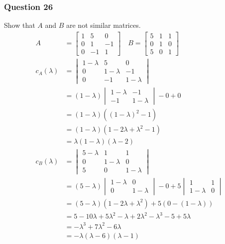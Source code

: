 \documentclass{math}
\begin{document}
\subsubsection*{Question 26}
Show that \( A \) and \( B \) are not similar matrices.
\begin{align*}
  A &= \begin{bmatrix}
    1 & 5 & 0 \\
    0 & 1 & -1 \\
    0 & -1 & 1
  \end{bmatrix} \quad B = \begin{bmatrix}
    5 & 1 & 1 \\
    0 & 1 & 0 \\
    5 & 0 & 1
  \end{bmatrix} \\
  c_A(\lambda) &= \begin{vmatrix}
    1-\lambda & 5 & 0 \\
    0 & 1-\lambda & -1 \\
    0 & -1 & 1-\lambda
  \end{vmatrix} \\
  &= (1-\lambda)\begin{vmatrix}
    1-\lambda & -1 \\
    -1 & 1-\lambda
  \end{vmatrix}-0+0 \\
  &= (1-\lambda)((1-\lambda)^2-1) \\
  &= (1-\lambda)(1-2\lambda+\lambda^2-1) \\
  &= \lambda(1-\lambda)(\lambda-2) \\
  c_B(\lambda) &= \begin{vmatrix}
    5-\lambda & 1 & 1 \\
    0 & 1-\lambda & 0 \\
    5 & 0 & 1-\lambda
  \end{vmatrix} \\
  &= (5-\lambda)\begin{vmatrix}
    1-\lambda & 0 \\
    0 & 1-\lambda
  \end{vmatrix}-0+5\begin{vmatrix}
    1 & 1 \\
    1-\lambda & 0
  \end{vmatrix} \\
  &= (5-\lambda)(1-2\lambda+\lambda^2)+5(0-(1-\lambda)) \\
  &= 5-10\lambda+5\lambda^2-\lambda+2\lambda^2-\lambda^3-5+5\lambda \\
  &= -\lambda^3+7\lambda^2-6\lambda \\
  &= -\lambda(\lambda-6)(\lambda-1)
\end{align*}
\end{document}
